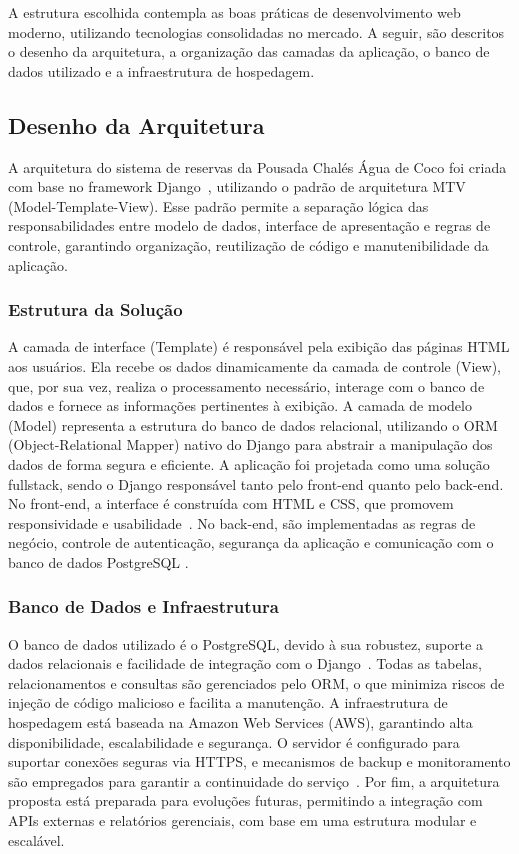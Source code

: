 \documentclass[
	12pt,				%
	openany,			%
	oneside,			%
	a4paper,			%
	english,			%
	french,				%
	spanish,			%
	brazil				%
	]{abntex2}
\begin{document}
A estrutura escolhida contempla as boas práticas de desenvolvimento web moderno, utilizando tecnologias consolidadas no mercado. A seguir, são descritos o desenho da arquitetura, a organização das camadas da aplicação, o banco de dados utilizado e a infraestrutura de hospedagem.
\subsection{Desenho da Arquitetura}
A arquitetura do sistema de reservas da Pousada Chalés Água de Coco foi criada com base no framework Django~\cite{django}, utilizando o padrão de arquitetura MTV (Model-Template-View). Esse padrão permite a separação lógica das responsabilidades entre modelo de dados, interface de apresentação e regras de controle, garantindo organização, reutilização de código e manutenibilidade da aplicação.

\subsubsection{Estrutura da Solução}

A camada de interface (Template) é responsável pela exibição das páginas HTML aos usuários. Ela recebe os dados dinamicamente da camada de controle (View), que, por sua vez, realiza o processamento necessário, interage com o banco de dados e fornece as informações pertinentes à exibição. A camada de modelo (Model) representa a estrutura do banco de dados relacional, utilizando o ORM (Object-Relational Mapper) nativo do Django para abstrair a manipulação dos dados de forma segura e eficiente.
A aplicação foi projetada como uma solução fullstack, sendo o Django responsável tanto pelo front-end quanto pelo back-end. No front-end, a interface é construída com HTML e CSS, que promovem responsividade e usabilidade~\cite{duckett}. No back-end, são implementadas as regras de negócio, controle de autenticação, segurança da aplicação e comunicação com o banco de dados PostgreSQL
.
\subsubsection{Banco de Dados e Infraestrutura}

O banco de dados utilizado é o PostgreSQL, devido à sua robustez, suporte a dados relacionais e facilidade de integração com o Django~\cite{postgresql}. Todas as tabelas, relacionamentos e consultas são gerenciados pelo ORM, o que minimiza riscos de injeção de código malicioso e facilita a manutenção.
A infraestrutura de hospedagem está baseada na Amazon Web Services (AWS), garantindo alta disponibilidade, escalabilidade e segurança. O servidor é configurado para suportar conexões seguras via HTTPS, e mecanismos de backup e monitoramento são empregados para garantir a continuidade do serviço~\cite{aws-doc}.
Por fim, a arquitetura proposta está preparada para evoluções futuras, permitindo a integração com APIs externas e relatórios gerenciais, com base em uma estrutura modular e escalável.
\end{document}

